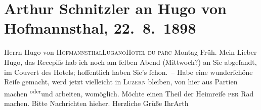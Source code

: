 

         
         \renewcommand{\erwaehntePersonen}{Personen: Hugo von Hofmannsthal}
         \renewcommand{\erwaehnteOrte}{Orte: Hôtel du Parc, Lugano, Luzern}
         \renewcommand{\erwaehnteWerke}{}
               \section[Arthur Schnitzler an Hugo von Hofmannsthal, 22. 8. 1898]{ Arthur Schnitzler an Hugo von Hofmannsthal, 22. 8. 1898}\nopagebreak{}\rehead{ }\begin{ledgroupsized}[t]{13cm}\normalsize\beginnumbering \toendnotes[C]{\smallbreak\pagebreak[2]} 
\pstart{}{\pb}Herrn Hugo von \textsc{Hofmannsthal}\pend{}\pstart{}\textsc{Lugano}\pend{}\pstart{}\textsc{Hotel du parc}\pend{}{\bigskip}\pstart
           \raggedleft{}{\pb}Montag{ }Früh.\pend
           \pstart
           Mein Lieber Hugo, das Recepiſs hab ich noch am ſelben Abend
                  (Mittwoch?) an Sie abgeſandt, im Couvert des Hotels; hoffentlich
               haben Sie’s ſchon. –\pend
           \pstart
           Habe eine wunderſchöne Reiſe gemacht, werd jetzt vielleicht in \textsc{Luzern} bleiben, von hier aus Partien machen \substVorne{}\textsuperscript{oder}\substDazwischen{}und\substHinten{} arbeiten, womöglich. Möchte einen Theil der Heimreiſe \textsc{per} Rad machen.\pend
           \pstart
           Bitte Nachrichten hieher. Herzliche Grüße Ihr\spacefill\mbox{Arth}\pend
           
         
         \endnumbering{}\end{ledgroupsized}  \newcommand{\dateiname}{L00837}\newcommand{\titel}{Arthur Schnitzler an Hugo von Hofmannsthal, 22. 8. 1898}\newcommand{\editorInnen}{Martin Anton Müller und Gerd-Hermann Susen}
      